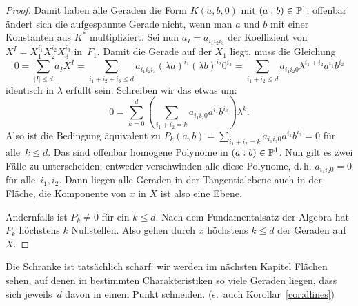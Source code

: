\begin{proof}
Damit haben alle Geraden die Form $K(a,b,0)$ mit $(a:b) \in \mathbb P^{1}$: offenbar ändert sich die aufgespannte Gerade nicht, wenn man $a$ und $b$ mit einer Konstanten aus $K^*$ multipliziert. Sei nun $a_I = a_{i_1 i_2 i_3}$ der Koeffizient von $X^I = X_1^{i_1} X_2^{i_2} X_3^{i_3}$ in~$F_1$. Damit die Gerade auf der $X_1$ liegt, muss die Gleichung
\begin{equation*}
0 = \sum_{|I| \leq d} a_I X^I = \sum_{i_1+i_2+i_3 \leq d} a_{i_1 i_2 i_3} (\lambda a)^{i_1} (\lambda b)^{i_2} 0^{i_3} = \sum_{i_1+i_2 \leq d} a_{i_1 i_2 0} \lambda^{i_1+i_2} a^{i_1} b^{i_2}
\end{equation*}
identisch in $\lambda$ erfüllt sein. Schreiben wir das etwas um:
\begin{equation*}
0 = \sum_{k=0}^d \left( \sum_{i_1+i_2 = k} a_{i_1 i_2 0} a^{i_1} b^{i_2} \right) \lambda^k.
\end{equation*}
Also ist die Bedingung äquivalent zu $P_k(a,b) = \sum_{i_1+i_2 = k} a_{i_1 i_2 0} a^{i_1} b^{i_2} = 0$ für alle~$k \leq d$. Das sind offenbar homogene Polynome in $(a:b) \in \mathbb P^{1}$. Nun gilt es zwei Fälle zu unterscheiden: entweder verschwinden alle diese Polynome, d.\,h. $a_{i_1 i_2 0} = 0$ für alle~$i_1, i_2$. Dann liegen alle Geraden in der Tangentialebene auch in der Fläche, die Komponente von $x$ in $X$ ist also eine Ebene.

Andernfalls ist $P_k \neq 0$ für ein $k \leq d$. Nach dem Fundamentalsatz der Algebra hat $P_k$ höchstens $k$ Nullstellen. Also gehen durch $x$ höchstens $k \leq d$ der Geraden auf $X$.
\end{proof}
\begin{remarks}
Die Schranke ist tatsächlich scharf: wir werden im nächsten Kapitel Flächen sehen, auf denen in bestimmten Charakteristiken so viele Geraden liegen, dass sich jeweils~$d$ davon in einem Punkt schneiden. (s.~auch Korollar~\ref{cor:dlines})
\end{remarks}
